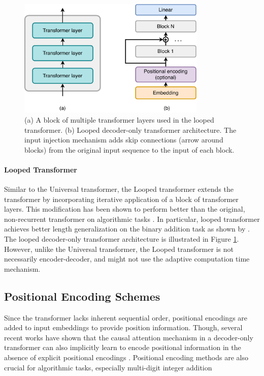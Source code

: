 \begin{figure}[h!]
    \centering
    \includegraphics[width=0.8\textwidth]{fig/looped_transformer.pdf}
    \caption{(a) A block of multiple transformer layers used in the looped transformer. (b) Looped decoder-only transformer architecture. The input injection mechanism adds skip connections (arrow around blocks) from the original input sequence to the input of each block.}
    \label{fig:looped_transformer}
\end{figure}

\paragraph{Looped Transformer}
Similar to the Universal transformer, the Looped transformer \parencite{yang_looped_2023} extends the transformer by incorporating iterative application of a block of transformer layers. This modification has been shown to perform better than the original, non-recurrent transformer on algorithmic tasks \parencite{csordas_systematic_2023,yang_looped_2023}. In particular, looped transformer achieves better length generalization on the binary addition task as shown by \cite{fan_looped_2024}. The looped decoder-only transformer architecture is illustrated in Figure \ref{fig:looped_transformer}. However, unlike the Universal transformer, the Looped transformer is not necessarily encoder-decoder, and might not use the adaptive computation time mechanism.

\subsection{Positional Encoding Schemes}\label{subsec:positional_encoding}

Since the transformer lacks inherent sequential order, positional encodings are added to input embeddings to provide position information. Though, several recent works have shown that the causal attention mechanism in a decoder-only transformer can also implicitly learn to encode positional information in the absence of explicit positional encodings \parencite{haviv_transformer_2022,zuo_breaking_2024,zhou_transformers_2024}. Positional encoding methods are also crucial for algorithmic tasks, especially multi-digit integer addition \parencite{shen_positional_2023,kazemnejad_impact_2023,ruoss_randomized_2023}

